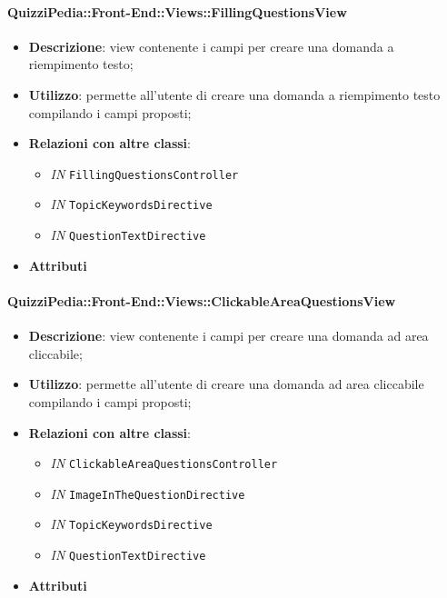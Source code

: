 \paragraph{QuizziPedia::Front-End::Views::FillingQuestionsView}
\begin{itemize}
	\item \textbf{Descrizione}: view contenente i campi per creare una domanda a riempimento testo;
	\item \textbf{Utilizzo}:  permette all'utente di creare una domanda a riempimento testo compilando i campi proposti;
	\item \textbf{Relazioni con altre classi}:
	\begin{itemize}
		\item \textit{IN} \texttt{FillingQuestionsController} \\
		\item \textit{IN} \texttt{TopicKeywordsDirective} \\
		\item \textit{IN} \texttt{QuestionTextDirective} \\ 
	\end{itemize}
	\item \textbf{Attributi}
\end{itemize}

\paragraph{QuizziPedia::Front-End::Views::ClickableAreaQuestionsView}
\begin{itemize}
	\item \textbf{Descrizione}: view contenente i campi per creare una domanda ad area cliccabile;
	\item \textbf{Utilizzo}:  permette all'utente di creare una domanda ad area cliccabile compilando i campi proposti;
	\item \textbf{Relazioni con altre classi}:
	\begin{itemize}
		\item \textit{IN} \texttt{ClickableAreaQuestionsController} \\
		\item \textit{IN} \texttt{ImageInTheQuestionDirective} \\
		\item \textit{IN} \texttt{TopicKeywordsDirective} \\
		\item \textit{IN} \texttt{QuestionTextDirective} \\ 
	\end{itemize}
	\item \textbf{Attributi}
\end{itemize}

